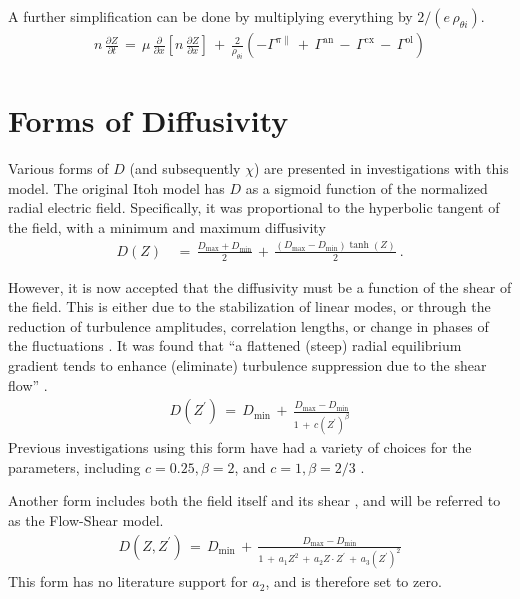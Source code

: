 A further simplification can be done by multiplying everything by $2 / (e \, \rho_{\theta i})$.
\begin{align}
	n \, \frac{\partial Z}{\partial t} \,=\, \mu \, \frac{\partial}{\partial x}
		\left[n \, \frac{\partial Z}{\partial x}\right] \,+\,
		\frac{2}{\rho_{\theta i}} \left(-\Gamma^{\pi\parallel} \,+\,
		\Gamma^\text{an} \,-\, \Gamma^\text{cx} \,-\, \Gamma^\text{ol}\right)
		\label{eq:reduced_normalized_Z_equation}
\end{align}

\section{Forms of Diffusivity}\label{sec:diffusivity}
Various forms of $D$ (and subsequently $\chi$) are presented in investigations with this model.
The original Itoh model has $D$ as a sigmoid function of the normalized radial electric field.
Specifically, it was proportional to the hyperbolic tangent of the field, with a minimum and maximum diffusivity \cite{itoh_edge_1991, zohm_dynamic_1994}
\begin{align} %
	D(Z) \,&=\, \frac{D_\text{max} + D_\text{min}}{2} \,+\,
		\frac{(D_\text{max} - D_\text{min})\tanh(Z)}{2}~.
		\label{eq:Itoh_diffusivity}
\end{align}

However, it is now accepted that the diffusivity must be a function of the shear of the field.
This is either due to the stabilization of linear modes, or through the reduction of turbulence amplitudes, correlation lengths, or change in phases of the fluctuations \cite{connor_review_2000}.
It was found that ``a flattened (steep) radial equilibrium gradient tends to enhance (eliminate) turbulence suppression due to the shear flow'' \cite{zhang_edge_1992}.
\begin{align} %
	D(Z^{\prime}) \,=\, D_\text{min} \,+\, \frac{D_\text{max} - D_\text{min}}
		{1 \,+\, c(Z^{\prime})^{\beta}} \label{eq:shear_diffusivity}
\end{align}
Previous investigations using this form have had a variety of choices for the parameters, including $c = 0.25, \beta = 2$, and $c = 1, \beta = 2/3$ \cite{connor_review_2000} \cite{itoh_theoretical_1994}.

Another form includes both the field itself and its shear \cite{paquay_studying_2012}, and will be referred to as the Flow-Shear model.
\begin{align} %
	D(Z, Z^{\prime}) \,=\, D_\text{min} \,+\,
		\frac{D_\text{max} - D_\text{min}}{1 \,+\, a_1 Z^2 \,+\,
		a_2 Z \cdot Z^{\prime} \,+\, a_3 (Z^{\prime})^2}
		\label{eq:flow_shear_diffusivity}
\end{align}
This form has no literature support for $a_2$, and is therefore set to zero.

